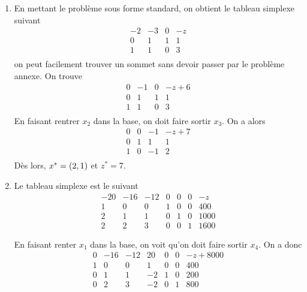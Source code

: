 \begin{enumerate}
    \begin{solution}
      \begin{enumerate}
        \item En mettant le problème sous forme standard,
          on obtient le tableau simplexe suivant
          \[
            \begin{array}{ccc|l}
              -2 & -3 & 0 & -z\\
              \hline
              0 &  1 & 1 & 1\\
              1 &  1 & 0 & 3\\
            \end{array}
          \]
          on peut facilement trouver un sommet sans devoir passer
          par le problème annexe.
          On trouve
          \[
            \begin{array}{ccc|l}
              0 & -1 & 0 & -z+6\\
              \hline
              0 &  1 & 1 & 1\\
              1 &  1 & 0 & 3\\
            \end{array}
          \]
          En faisant rentrer $x_2$ dans la base,
          on doit faire sortir $x_3$.
          On a alors
          \[
            \begin{array}
              {ccc|l}
              0 & 0 & -1 & -z+7\\
              \hline
              0 &  1 & 1 & 1\\
              1 &  0 & -1 & 2\\
            \end{array}
          \]
          Dès lors, $x^* = (2,1)$ et $z^* = 7$.
        \item
          \label{itm:sim400}
          Le tableau simplexe est le suivant
          \[
            \begin{array}{cccccc|l}
              -20 & -16 & -12 & 0 & 0 & 0 & -z\\
              \hline
              1 &   0 &   0 & 1 & 0 & 0 & 400\\
              2 &   1 &   1 & 0 & 1 & 0 & 1000\\
              2 &   2 &   3 & 0 & 0 & 1 & 1600
            \end{array}
          \]

          En faisant renter $x_1$ dans la base,
          on voit qu'on doit faire sortir $x_4$.
          On a donc
          \[
            \begin{array}{cccccc|l}
              0 & -16 & -12 & 20 & 0 & 0 & -z+8000\\
              \hline
              1 &   0 &   0 &  1 & 0 & 0 & 400\\
              0 &   1 &   1 & -2 & 1 & 0 & 200\\
              0 &   2 &   3 & -2 & 0 & 1 & 800
            \end{array}
          \]


\end{enumerate}
\end{solution}
\end{enumerate}
